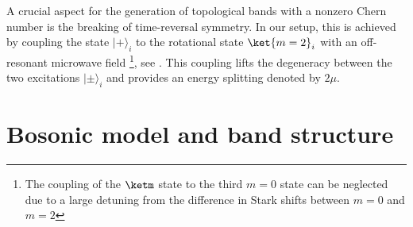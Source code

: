 A crucial aspect for the generation of topological bands with a nonzero Chern number is the breaking of time-reversal symmetry.
In our setup, this is achieved by coupling the state $|+\rangle_{i}$ to the rotational state $\ket{m=2}_{i}$ with an off-resonant microwave field \footnote{The coupling of the $\ketm$ state to the third $m=0$ state can be neglected due to a large detuning from the difference in Stark shifts between $m=0$ and $m=2$}, see .
This coupling lifts the degeneracy between the two excitations $|\pm\rangle_{i}$ and provides an energy splitting denoted by $2 \mu$.



\section{Bosonic model and band structure}

